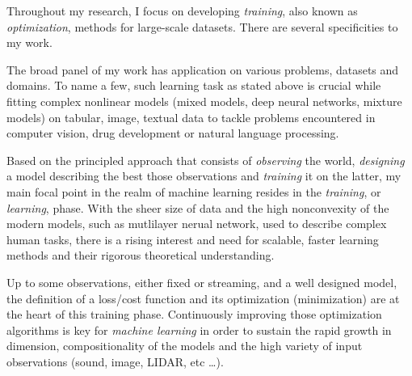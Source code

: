 \documentclass[twoside,11pt]{article}
\begin{document}
%
%
%
%
%
%
%


\textbf{}  \hfill \textbf{} 

 \hfill {}

\hfill

Throughout my research, I focus on developing \emph{training}, also known as \emph{optimization}, methods for large-scale datasets.
There are several specificities to my work.

The broad panel of my work has application on various problems, datasets and domains.
To name a few, such learning task as stated above is crucial while fitting complex nonlinear models (mixed models, deep neural networks, mixture models) on tabular, image, textual data to tackle problems encountered in computer vision, drug development or natural language processing.

Based on the principled approach that consists of \emph{observing} the world, \emph{designing} a model describing the best those observations and \emph{training} it on the latter, my main focal point in the realm of machine learning resides in the \emph{training}, or \emph{learning}, phase.
With the sheer size of data and the high nonconvexity of the modern models, such as mutlilayer nerual network, used to describe complex human tasks, there is a rising interest and need for scalable, faster learning methods and their rigorous theoretical understanding.

Up to some observations, either fixed or streaming, and a well designed model, the definition of a loss/cost function and its optimization (minimization) are at the heart of this training phase.
Continuously improving those optimization algorithms is key for \emph{machine learning} in order to sustain the rapid growth in dimension, compositionality of the models and the high variety of input observations (sound, image, LIDAR, etc \dots).
\end{document}
